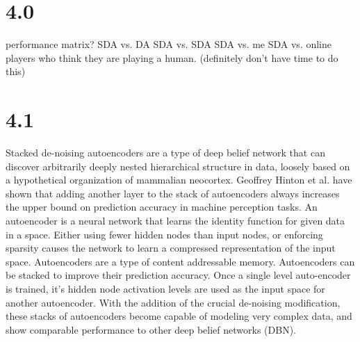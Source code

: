 \documentclass[11pt]{article}
\begin{document}
\section{4.0}
\label{Performace of SDA-based player against DA player and various other opponents}

performance matrix?
SDA vs. DA
SDA vs. SDA
SDA vs. me
SDA vs. online players who think they are playing a human. (definitely don't have time to do this)

\section{4.1}
\label{Conclusion and lessons learned}










Stacked de-noising autoencoders are a type of deep belief network that can discover arbitrarily deeply nested hierarchical structure in data, loosely based on a hypothetical organization of mammalian neocortex. Geoffrey Hinton et al. have shown that adding another layer to the stack of autoencoders always increases the upper bound on prediction accuracy in machine perception tasks. An autoencoder is a neural network that learns the identity function for given data in a space. Either using fewer hidden nodes than input nodes, or enforcing sparsity causes the network to learn a compressed representation of the input space. Autoencoders are a type of content addressable memory. Autoencoders can be stacked to improve their prediction accuracy. Once a single level auto-encoder is trained, it's hidden node activation levels are used as the input space for another autoencoder. With the addition of the crucial de-noising modification, these stacks of autoencoders become capable of modeling very complex data, and show comparable performance to other deep belief networks (DBN).
\end{document}
